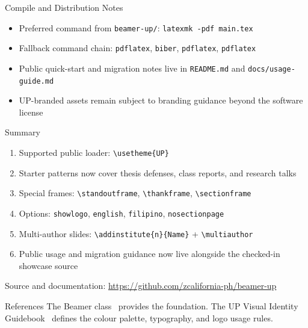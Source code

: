 \documentclass[aspectratio=169]{beamer}
\begin{document}
\begin{frame}{Compile and Distribution Notes}
  \begin{itemize}
    \item Preferred command from \texttt{beamer-up/}: \texttt{latexmk -pdf main.tex}
    \item Fallback command chain: \texttt{pdflatex}, \texttt{biber}, \texttt{pdflatex}, \texttt{pdflatex}
    \item Public quick-start and migration notes live in \texttt{README.md} and \texttt{docs/usage-guide.md}
    \item UP-branded assets remain subject to branding guidance beyond the software license
  \end{itemize}
\end{frame}

\begin{frame}{Summary}
  \begin{enumerate}
    \item Supported public loader: \texttt{\textbackslash usetheme\{UP\}}
    \item Starter patterns now cover thesis defenses, class reports, and research talks
    \item Special frames: \texttt{\textbackslash standoutframe}, \texttt{\textbackslash thankframe}, \texttt{\textbackslash sectionframe}
    \item Options: \texttt{showlogo}, \texttt{english}, \texttt{filipino}, \texttt{nosectionpage}
    \item Multi-author slides: \texttt{\textbackslash addinstitute\{n\}\{Name\}} + \texttt{\textbackslash multiauthor}
    \item Public usage and migration guidance now live alongside the checked-in showcase source
  \end{enumerate}

  \vskip 12pt
  {\small Source and documentation: \url{https://github.com/zcalifornia-ph/beamer-up}}
\end{frame}


\begin{frame}[allowframebreaks]{References}
  The Beamer class~\cite{tantau2004} provides the foundation.
  The UP Visual Identity Guidebook~\cite{upvig2017} defines the colour palette,
  typography, and logo usage rules.

  \vskip 6pt
  \printbibliography
\end{frame}
\end{document}
